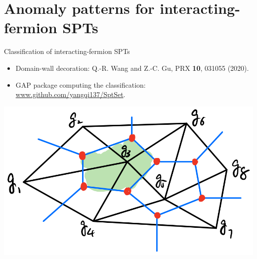 \documentclass[xcolor=table, 11pt, aspectratio=169]{beamer}
\begin{document}
    \section{Anomaly patterns for interacting-fermion SPTs}

    \begin{frame}{Classification of interacting-fermion SPTs}
      \begin{itemize}
      \item Domain-wall decoration: Q.-R. Wang and Z.-C. Gu, PRX \textbf{10}, 031055 (2020).
      \item GAP package computing the classification: \url{www.github.com/yangqi137/SptSet}.
      \end{itemize}
      \begin{center}
      \includegraphics[width=.4\textwidth]{../chainmap/decoration.png}
      \end{center}
    \end{frame}
    
\end{document}
